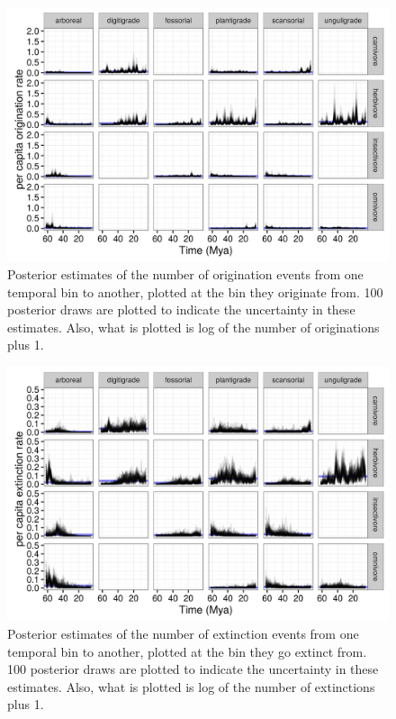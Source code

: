 \documentclass[12pt,letterpaper]{article}
\begin{document}
\begin{figure}[ht]
  \centering
  \includegraphics[width=\textwidth,height=0.4\textheight,keepaspectratio=true]{figure/birth_eco}
  \caption[Estimated number of origination events by mammal ecotype]{Posterior estimates of the number of origination events from one temporal bin to another, plotted at the bin they originate from. 100 posterior draws are plotted to indicate the uncertainty in these estimates. Also, what is plotted is log of the number of originations plus 1.}
  \label{fig:ecotype_birth}
\end{figure}

\begin{figure}[ht]
  \centering
  \includegraphics[width=\textwidth,height=0.4\textheight,keepaspectratio=true]{figure/death_eco}
  \caption[Estimated number of extinction events by mammal ecotype]{Posterior estimates of the number of extinction events from one temporal bin to another, plotted at the bin they go extinct from. 100 posterior draws are plotted to indicate the uncertainty in these estimates. Also, what is plotted is log of the number of extinctions plus 1.}
  \label{fig:ecotype_death}
\end{figure}
\end{document}
